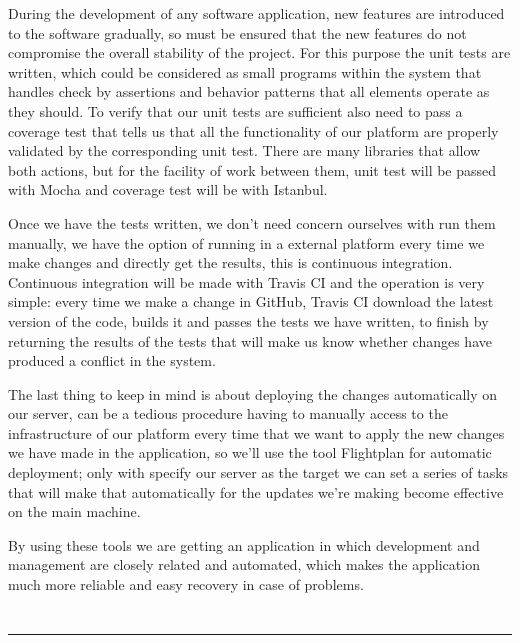 {\bigskip
During the development of any software application, new features are introduced to the software gradually, so must be ensured
that the new features do not compromise the overall stability of the project. For this purpose the unit tests are written, 
which could be considered as small programs within the system that handles check by assertions and behavior patterns that all
elements operate as they should. To verify that our unit tests are sufficient also need to pass a coverage test that tells us
that all the functionality of our platform are properly validated by the corresponding unit test. There are many libraries that
allow both actions, but for the facility of work between them, unit test will be passed with Mocha and coverage test will be
with Istanbul.

\bigskip
Once we have the tests written, we don't need concern ourselves with run them manually, we have the option of running in a
external platform every time we make changes and directly get the results, this is continuous integration. Continuous
integration will be made with Travis CI and the operation is very simple: every time we make a change in GitHub, Travis CI
download the latest version of the code, builds it and passes the tests we have written, to finish by returning the results
of the tests that will make us know whether changes have produced a conflict in the system. 

\bigskip
The last thing to keep in mind is about deploying the changes automatically on our server, can be a tedious procedure having to
manually access to the infrastructure of our platform every time that we want to apply the new changes we have made in the
application, so we'll use the tool Flightplan for automatic deployment; only with specify our server as the target we can set
a series of tasks that will make that automatically for the updates we're making become effective on the main machine.

\bigskip
By using these tools we are getting an application in which development and management are closely related and automated, which
makes the application much more reliable and easy recovery in case of problems.

\chapter*{}
\thispagestyle{empty}

\noindent\rule[-1ex]{\textwidth}{2pt}\\[4.5ex]

}
